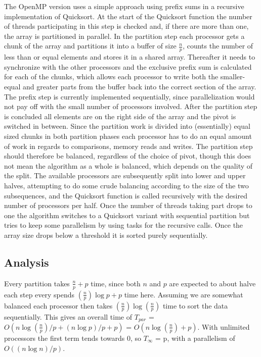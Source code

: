 \documentclass[12pt,a4paper]{article}
\begin{document}
The OpenMP version uses a simple approach using prefix sums in a recursive implementation of Quicksort.
At the start of the Quicksort function the number of threads participating in this step is checked and, if there are more than one, the array is partitioned in parallel.
In the partition step each processor gets a chunk of the array and partitions it into a buffer of size $\frac{n}{p}$, counts the number of less than or equal elements and stores it in a shared array. Thereafter it needs to synchronize with the other processors and the exclusive prefix sum is calculated for each of the chunks, which allows each processor to write both the smaller-equal and greater parts from the buffer back into the correct section of the array.
The prefix step is currently implemented sequentially, since parallelization would not pay off with the small number of processors involved.
After the partition step is concluded all elements are on the right side of the array and the pivot is switched in between.  Since the partition work is divided into (essentially) equal sized chunks in both partition phases each processor has to do an equal amount of work in regards to comparisons, memory reads and writes. The partition step should therefore be balanced, regardless of the choice of pivot, though this does not mean the algorithm as a whole is balanced, which depends on the quality of the split.
The available processors are subsequently split into lower and upper halves, attempting to do some crude balancing according to the size of the two subsequences, and the Quicksort function is called recursively with the desired number of processors per half.
Once the number of threads taking part drops to one the algorithm switches to a Quicksort variant with sequential partition but tries to keep some parallelism by using tasks for the recursive calls. Once the array size drops below a threshold it is sorted purely sequentially.

\subsection{Analysis}
Every partition takes $\frac{n}{p} + p$ time, since both $n$ and $p$ are expected to about halve each step every spends $(\frac{n}{p})\log p + p$ time here. Assuming we are somewhat balanced each processor then takes $(\frac{n}{p})\log(\frac{n}{p})$ time to sort the data sequentially. This gives an overall time of $T_{par}$ = $O(n\log (\frac{n}{p})/p + (n\log p)/p + p)$ = $O(n\log (\frac{n}{p}) + p)$. With unlimited processors the first term tends towards 0, so $T_{\infty}$ = p, with a parallelism of $O((n\log n)/p)$. 
\end{document}
